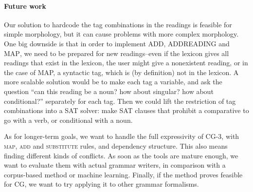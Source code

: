 




\paragraph{Future work} 


Our solution to hardcode the tag combinations in the readings is feasible for simple morphology, but it can cause problems with more complex morphology. One big downside is that in order to implement \textsc{ADD}, \textsc{ADDREADING} and \textsc{MAP}, we need to be prepared for new readings--even if the lexicon gives all readings that exist in the lexicon, the user might give a nonexistent reading, or in the case of MAP, a syntactic tag, which is (by definition) not in the lexicon. A more scalable solution would be to make each tag a variable, and ask the question ``can this reading be a noun? how about singular? how about conditional?'' separately for each tag. Then we could lift the restriction of tag combinations into a SAT solver: make SAT clauses that prohibit a comparative to go with a verb, or conditional with a noun.

As for longer-term goals, we want to handle the full expressivity of CG-3,
with \textsc{map}, \textsc{add} and \textsc{substitute} rules, and
dependency structure. This also means finding different kinds of conflicts.
As soon as the tools are mature enough, we want to
evaluate them with actual grammar writers,
in comparison with a corpus-based method or machine learning.
Finally, if the method proves feasible for CG, we want
to try applying it to other grammar formalisms.



